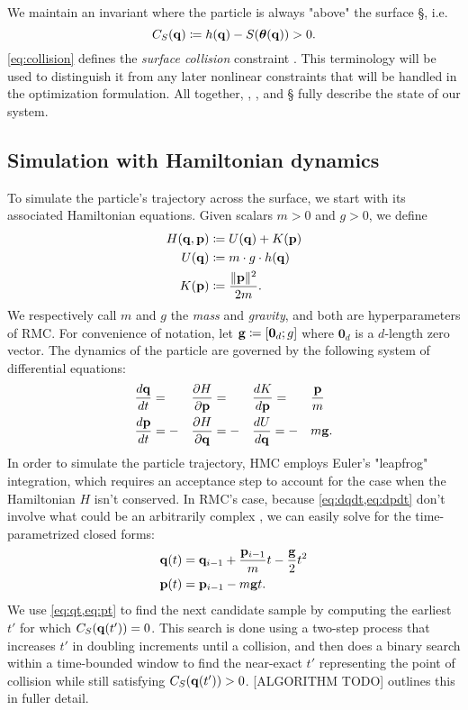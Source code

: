 We maintain an invariant where the particle is always "above" the surface \S,
i.e.
\begin{equation}
    \label{eq:collision}
    C_{S}({\mathbf{q}{}}) \coloneqq h(\mathbf{q}{}) - S(\boldsymbol{\theta}(\mathbf{q}{})) > 0.
\end{equation}
\cref{eq:collision} defines the \emph{surface collision} constraint \CS{}. This
terminology will be used to distinguish it from any later nonlinear constraints
that will be handled in the optimization formulation. All together, \q{}, \p{},
and \S{} fully describe the state of our system.

\subsection{Simulation with Hamiltonian dynamics} \label{ss:hamiltonian}

To simulate the particle's trajectory across the surface, we start with its
associated Hamiltonian equations. Given scalars $m > 0$ and $g > 0$, we define
\begin{align*}
    H(\mathbf{q}{}, \mathbf{p}{}) &\coloneqq U(\mathbf{q}{}) + K(\mathbf{p}{}) \\
    U(\mathbf{q}{}) &\coloneqq m \cdot g \cdot h(\mathbf{q}{}) \\
    K(\mathbf{p}{}) &\coloneqq \frac{\lVert \mathbf{p}{} \rVert^2}{2m}.
\end{align*}
We respectively call $m$ and $g$ the \emph{mass} and \emph{gravity}, and both
are hyperparameters of RMC. For convenience of notation, let $\mathbf{g}{} \coloneqq
[\mathbf{0}_d; g]$ where $\mathbf{0}_d$ is a $d$-length zero vector. The
dynamics of the particle are governed by the following system of differential
equations:
\begin{alignat}{4}
    &\frac{d\mathbf{q}{}}{dt} = &&\frac{\partial H}{\partial \mathbf{p}{}} = &&\frac{dK}{d\mathbf{p}{}} = &&\frac{\mathbf{p}{}}{m} \label{eq:dqdt} \\
    &\frac{d\mathbf{p}{}}{dt} = -&&\frac{\partial H}{\partial \mathbf{q}{}} = -&&\frac{dU}{d\mathbf{q}{}} = -&&m\mathbf{g}{}. \label{eq:dpdt}
\end{alignat}
In order to simulate the particle trajectory, HMC employs Euler's "leapfrog"
integration, which requires an acceptance step to account for the case when the
Hamiltonian $H$ isn't conserved. In RMC's case, because \cref{eq:dqdt,eq:dpdt}
don't involve what could be an arbitrarily complex \surface{}, we can easily
solve for the time-parametrized closed forms:
\begin{align}
    \mathbf{q}(t){} &= \mathbf{q}_{i-1}{} + \frac{\mathbf{p}_{i-1}{}}{m}t - \frac{\mathbf{g}{}}{2}t^2 \label{eq:qt} \\
    \mathbf{p}(t){} &= \mathbf{p}_{i-1}{} - m\mathbf{g}{}t. \label{eq:pt}
\end{align}
We use \cref{eq:qt,eq:pt} to find the next candidate sample \thetai{} by
computing the earliest $t'$ for which $C_{S}({\mathbf{q}(t')}) = 0$. This search is done
using a two-step process that increases $t'$ in doubling increments until a
collision, and then does a binary search within a time-bounded window to find
the near-exact $t'$ representing the point of collision while still satisfying
$C_{S}({\mathbf{q}(t')}) > 0$. [ALGORITHM TODO] outlines this in fuller detail.

